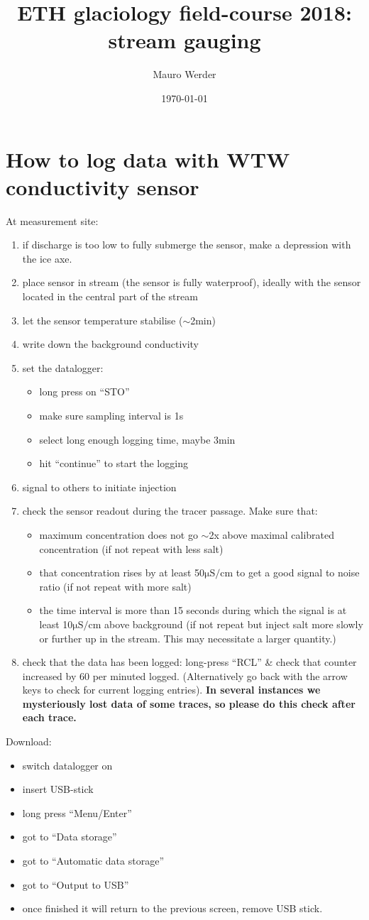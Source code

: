 \documentclass[DIV=15,halfparskip,11pt,headinclude]{scrartcl}
\author{Mauro Werder}
\date{\today}
\title{ETH glaciology field-course 2018:\\ stream gauging}
\begin{document}
\section{How to log data with WTW conductivity sensor}

At measurement site:
\begin{enumerate}
\item if discharge is too low to fully submerge the sensor, make a
depression with the ice axe.
\item place sensor in stream (the sensor is fully waterproof),
  ideally with the sensor located in the central part of the stream
\item let the sensor temperature stabilise ($\sim$2min)
\item write down the background conductivity
\item set the datalogger:
\begin{itemize}
\item long press on ``STO''
\item make sure sampling interval is 1s
\item select long enough logging time, maybe 3min
\item hit ``continue'' to start the logging
\end{itemize}
\item signal to others to initiate injection
\item check the sensor readout during the tracer passage.  Make sure
  that:
\begin{itemize}
\item maximum concentration does not go $\sim$2x above maximal
  calibrated concentration (if not repeat with less salt)
\item that concentration rises by at least 50$\mathrm{\mu S/cm}$ to get
  a good signal to noise ratio (if not repeat with more salt)
\item the time interval is more than 15 seconds during which the
  signal is at least 10$\mathrm{\mu S/cm}$ above background (if not
  repeat but inject salt more slowly or further up in the stream.
  This may necessitate a larger quantity.)
\end{itemize}
\item check that the data has been logged: long-press ``RCL'' \& check
  that counter increased by 60 per minuted logged. (Alternatively go
  back with the arrow keys to check for current logging entries).
  \textbf{In several instances we mysteriously lost data of some
    traces, so please do this check after each trace.}
\end{enumerate}


Download:
\begin{itemize}
\item switch datalogger on
\item insert USB-stick
\item long press ``Menu/Enter''
\item got to ``Data storage''
\item got to ``Automatic data storage''
\item got to ``Output to USB''
\item once finished it will return to the previous screen, remove USB
  stick.
\end{itemize}
\end{document}
